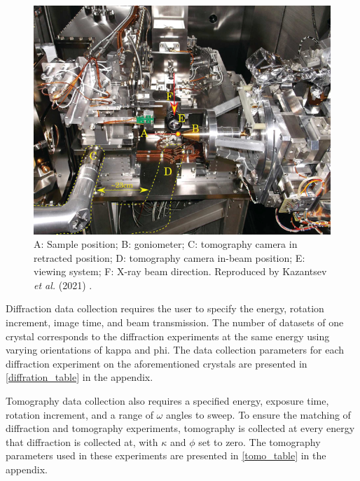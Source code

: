 \begin{figure}
    \centering
    \includegraphics{images/tomo camera.png}
    \caption{A: Sample position; B: goniometer; C: tomography camera in retracted position; D: tomography camera in-beam position; E: viewing system; F: X-ray beam direction. Reproduced by Kazantsev \textit{et al.} (2021) \cite{Kazantsev2021}.}
    \label{fig:vacuum_chamber}
\end{figure}

Diffraction data collection requires the user to specify the energy, rotation increment, image time, and beam transmission. The number of datasets of one crystal corresponds to the diffraction experiments at the same energy using varying orientations of kappa and phi. The data collection parameters for each diffraction experiment on the aforementioned crystals are presented in \cref{diffration_table} in the appendix.

Tomography data collection also requires a specified energy, exposure time, rotation increment, and a range of $\omega$ angles to sweep. %
To ensure the matching of diffraction and tomography experiments, tomography is collected at every energy that diffraction is collected at, with $\kappa$ and $\phi$ set to zero. The tomography parameters used in these experiments are presented in \cref{tomo_table} in the appendix.

